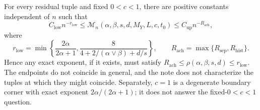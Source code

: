 For every residual tuple and fixed \(0<c<1\), there are positive constants independent of \(n\) such that \[C_{\mathrm{low}}n^{-r_{\mathrm{low}}}\le\mathcal M_n(\alpha,\beta,s,d,M_Y,L,c,t_0)\le C_{\mathrm{up}}n^{-R_{\mathrm{ach}}},\] where \[r_{\mathrm{low}}=\min\left\{\frac{2\alpha}{2\alpha+1},\frac{8}{4+2/(\alpha\vee\beta)+d/s}\right\},\qquad R_{\mathrm{ach}}=\max\{R_{\mathrm{sep}},R_{\mathrm{hist}}\}.\] Hence any exact exponent, if it exists, must satisfy \(R_{\mathrm{ach}}\le\rho(\alpha,\beta,s,d)\le r_{\mathrm{low}}\). The endpoints do not coincide in general, and the note does not characterize the tuples at which they might coincide. Separately, \(c=1\) is a degenerate boundary corner with exact exponent \(2\alpha/(2\alpha+1)\); it does not answer the fixed-\(0<c<1\) question.